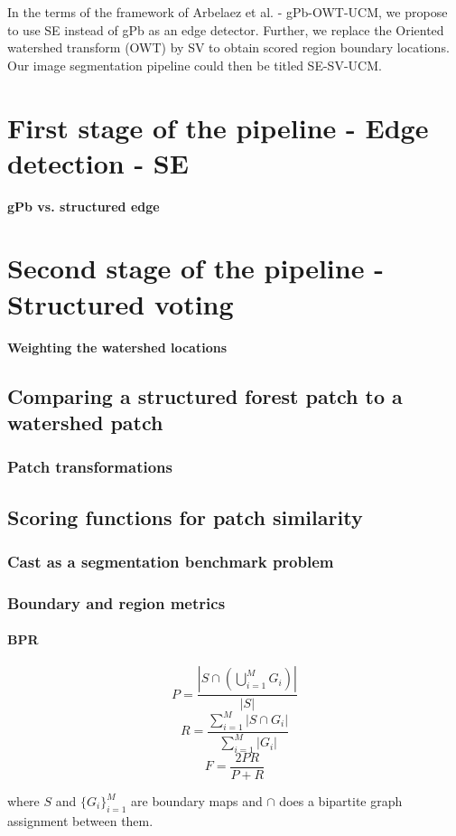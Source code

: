 In the terms of the framework of Arbelaez et al.\cite{Arbelaez11} - gPb-OWT-UCM, we propose to use SE instead of gPb as an edge detector. Further, we replace the Oriented watershed transform (OWT) by SV to obtain scored region boundary locations. Our image segmentation pipeline could then be titled SE-SV-UCM.

\section{First stage of the pipeline - Edge detection - SE}
\textbf{gPb vs. structured edge}

\section{Second stage of the pipeline - Structured voting}

\textbf{Weighting the watershed locations}
\subsection{Comparing a structured forest patch to a watershed patch}
\subsubsection{Patch transformations}
\subsection{Scoring functions for patch similarity}
\subsubsection{Cast as a segmentation benchmark problem}
\subsubsection{Boundary and region metrics}
\label{boundary-and-region-metrics-maths}
\paragraph{BPR}
\label{BPR-maths}
\[
P=\frac{\left|S\cap\left(\bigcup\limits _{i=1}^{M}G_{i}\right)\right|}{|S|}
\]
\[
R=\frac{{\sum\limits _{i=1}^{M}\left|S\cap G_{i}\right|}}{\sum\limits _{i=1}^{M}\left|G_{i}\right|}
\]
\[
F=\frac{2PR}{P+R}
\]


where $S$ and $\{G_{i}\}_{i=1}^{M}$ are boundary maps and $\cap$
does a bipartite graph assignment between them.


